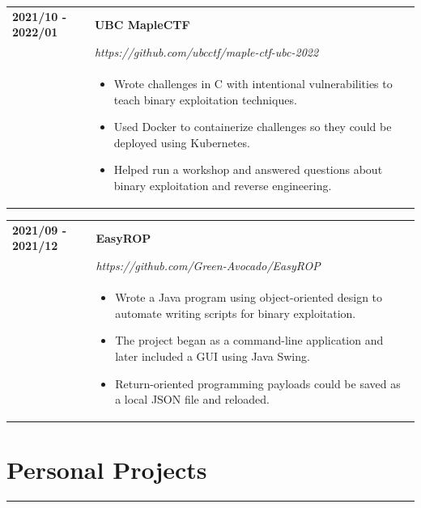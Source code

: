 \documentclass[letterpaper]{article}
\newcommand{\sectcolor}{cyan}
\newcommand{\sect}[1]{\section*{#1}
                        {\color{\sectcolor}
                        \rule{\textwidth}{1pt}
                        \vspace{-1ex}}}
\begin{document}
        \begin{tabular}{p{} p{}}
            \textbf{2021/10 - 2022/01} & \textbf{UBC MapleCTF} \\
            & \emph{https://github.com/ubcctf/maple-ctf-ubc-2022} \\
            & \begin{itemize}
                \item Wrote challenges in C with intentional vulnerabilities to teach binary exploitation
                    techniques.
                \item Used Docker to containerize challenges so they could be deployed using Kubernetes.
                \item Helped run a workshop and answered questions about binary exploitation and reverse
                    engineering.
            \end{itemize}
        \end{tabular}

        \begin{tabular}{p{} p{}}
            \textbf{2021/09 - 2021/12} & \textbf{EasyROP} \\
            & \emph{https://github.com/Green-Avocado/EasyROP} \\
            & \begin{itemize}
                \item Wrote a Java program using object-oriented design to automate writing scripts for
                    binary exploitation.
                \item The project began as a command-line application and later included a GUI using Java
                    Swing.
                \item Return-oriented programming payloads could be saved as a local JSON file and
                    reloaded.
            \end{itemize}
        \end{tabular}

    \sect{Personal Projects}
\end{document}
